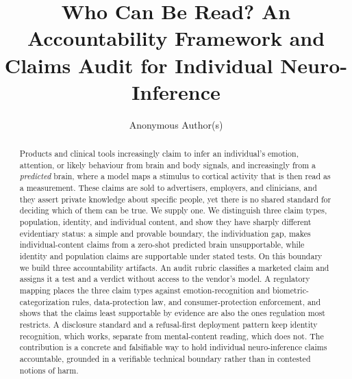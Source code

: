 \documentclass[sigconf,review,anonymous]{acmart}
\begin{document}
\title{Who Can Be Read? An Accountability Framework and Claims Audit for
Individual Neuro-Inference}

\author{Anonymous Author(s)}

\begin{abstract}
Products and clinical tools increasingly claim to infer an individual's emotion, attention, or likely
behaviour from brain and body signals, and increasingly from a \emph{predicted} brain, where a model maps a
stimulus to cortical activity that is then read as a measurement. These claims are sold to advertisers,
employers, and clinicians, and they assert private knowledge about specific people, yet there is no shared
standard for deciding which of them can be true. We supply one. We distinguish three claim types,
population, identity, and individual content, and show they have sharply different evidentiary status: a
simple and provable boundary, the individuation gap, makes individual-content claims from a zero-shot
predicted brain unsupportable, while identity and population claims are supportable under stated tests. On
this boundary we build three accountability artifacts. An audit rubric classifies a marketed claim and
assigns it a test and a verdict without access to the vendor's model. A regulatory mapping places the three
claim types against emotion-recognition and biometric-categorization rules, data-protection law, and
consumer-protection enforcement, and shows that the claims least supportable by evidence are also the ones
regulation most restricts. A disclosure standard and a refusal-first deployment pattern keep identity
recognition, which works, separate from mental-content reading, which does not. The contribution is a
concrete and falsifiable way to hold individual neuro-inference claims accountable, grounded in a verifiable
technical boundary rather than in contested notions of harm.
\end{abstract}


\maketitle
\end{document}
